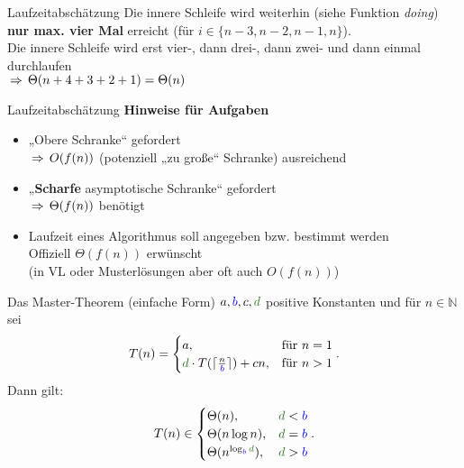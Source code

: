 \begin{frame}{Laufzeitabschätzung}
	Die innere Schleife wird weiterhin (siehe Funktion \emph{doing}) \textbf{nur max. vier Mal} erreicht (für $i \in \{n-3, n-2, n-1, n\}$). \\ \pause
	\impl Die innere Schleife wird erst vier-, dann drei-, dann zwei- und dann einmal durchlaufen \\ 
	$\impl \Theta(n + 4+3+2+1) = \Theta(n)$
\end{frame}

\begin{frame}{Laufzeitabschätzung}
	\textbf{Hinweise für Aufgaben} \\[0,25cm]
	\begin{itemize}
		\pause
		\item „Obere Schranke“ gefordert \\ 
		$\impl O(f(n))$ (potenziell „zu große“ Schranke) ausreichend
		\pause
		\item „\textbf{Scharfe} asymptotische Schranke“ gefordert \\ $\impl \Theta(f(n))$ benötigt
		\pause
		\item Laufzeit eines Algorithmus soll angegeben bzw. bestimmt werden \\ \impl Offiziell $\Theta(f(n))$ erwünscht \\ (in VL oder Musterlösungen aber oft auch $O(f(n))$)
	\end{itemize}
\end{frame}

\begin{frame}{Das Master-Theorem (einfache Form)}
	$a, \textcolor{blue}{b}, c, \textcolor{darkgreen}{d}$ positive Konstanten und für $n \in \mathbb{N}$ sei 
	\[
	T(n) = 
	\begin{cases}
	a,  & \text{für } n = 1 \\
	\textcolor{darkgreen}{d} \cdot T(\lceil \frac{n}{\textcolor{blue}{b}} \rceil) + cn, & \text{für } n > 1
	\end{cases}.
	\]
	Dann gilt:
	\[
	T(n) \in 
	\begin{cases}
	\Theta(n),                                                        & \textcolor{darkgreen}{d} < \textcolor{blue}{b} \\
	\Theta(n \log n),                                                 & \textcolor{darkgreen}{d} = \textcolor{blue}{b} \\
	\Theta(n^{\log _{\textcolor{blue}{b}} \textcolor{darkgreen}{d}}), & \textcolor{darkgreen}{d} > \textcolor{blue}{b}
	\end{cases}.
	\]
\end{frame}


